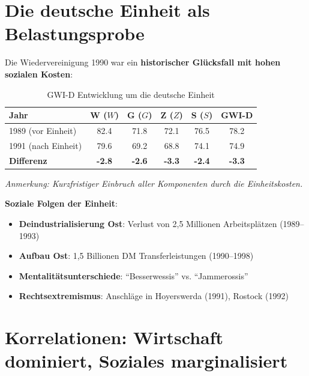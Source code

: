 \section{Die deutsche Einheit als Belastungsprobe}

Die Wiedervereinigung 1990 war ein \textbf{historischer Glücksfall mit hohen sozialen Kosten}:

\begin{table}[ht]
    \centering
    \caption{GWI-D Entwicklung um die deutsche Einheit}
    \label{tab:einheit_gwi}
    \begin{tabular}{lccccc}
        \toprule
        \textbf{Jahr} & \textbf{W (\(W\))} & \textbf{G (\(G\))} & \textbf{Z (\(Z\))} & \textbf{S (\(S\))} & \textbf{GWI-D} \\
        \midrule
        1989 (vor Einheit) & 82.4 & 71.8 & 72.1 & 76.5 & 78.2 \\
        1991 (nach Einheit) & 79.6 & 69.2 & 68.8 & 74.1 & 74.9 \\
        \textbf{Differenz} & \textbf{-2.8} & \textbf{-2.6} & \textbf{-3.3} & \textbf{-2.4} & \textbf{-3.3} \\
        \bottomrule
    \end{tabular}
\end{table}

\begin{flushleft}
\footnotesize{\textit{Anmerkung: Kurzfristiger Einbruch aller Komponenten durch die Einheitskosten.}}
\end{flushleft}

\textbf{Soziale Folgen der Einheit}:
\begin{itemize}
    \item \textbf{Deindustrialisierung Ost}: Verlust von 2,5 Millionen Arbeitsplätzen (1989–1993)
    \item \textbf{Aufbau Ost}: 1,5 Billionen DM Transferleistungen (1990–1998)
    \item \textbf{Mentalitätsunterschiede}: \enquote{Besserwessis} vs. \enquote{Jammerossis}
    \item \textbf{Rechtsextremismus}: Anschläge in Hoyerswerda (1991), Rostock (1992)
\end{itemize}

\section{Korrelationen: Wirtschaft dominiert, Soziales marginalisiert}


